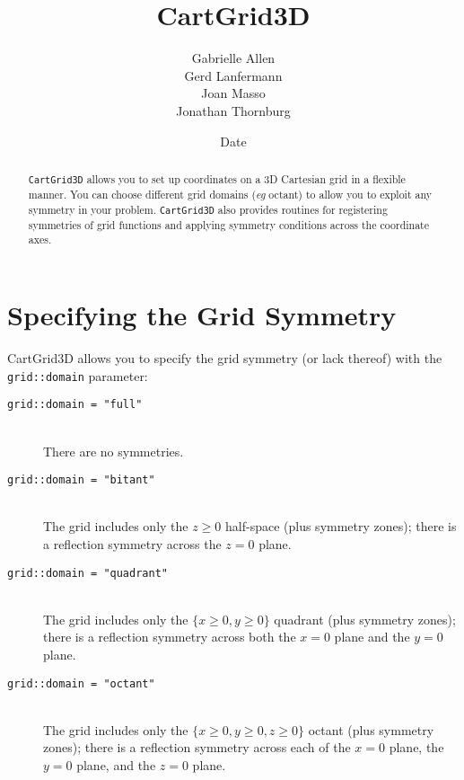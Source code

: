 \documentclass{article}
\begin{document}
\title{CartGrid3D}
\author{Gabrielle Allen \\ Gerd Lanfermann \\ Joan Masso \\ Jonathan Thornburg}
\date{$ $Date$ $}

\maketitle


\begin{abstract}
{\tt CartGrid3D} allows you to set up coordinates on a 3D Cartesian
grid in a flexible manner.  You can choose different grid domains
({\it eg} octant) to allow you to exploit any symmetry in your problem.
{\tt CartGrid3D} also provides routines for registering symmetries
of grid functions and applying symmetry conditions across the
coordinate axes. 
\end{abstract}


\section{Specifying the Grid Symmetry}

CartGrid3D allows you to specify the grid symmetry (or lack thereof) with the
\verb|grid::domain| parameter:
\begin{description}
\item[{\tt grid::domain = "full"}]\mbox{}\\
	There are no symmetries.
\item[{\tt grid::domain = "bitant"}]\mbox{}\\
	The grid includes only the $z \ge 0$ half-space
	(plus symmetry zones); there is a reflection symmetry
	across the $z=0$ plane.
\item[{\tt grid::domain = "quadrant"}]\mbox{}\\
	The grid includes only the $\{x \ge 0, y \ge 0\}$ quadrant
	(plus symmetry zones); there is a reflection symmetry
	across both the $x=0$ plane and the $y=0$ plane.
\item[{\tt grid::domain = "octant"}]\mbox{}\\
	The grid includes only the $\{x \ge 0, y \ge 0, z \ge 0\}$
	octant (plus symmetry zones); there is a reflection symmetry
	across each of the $x=0$ plane, the $y=0$ plane, and the $z=0$
	plane.
\end{description}
\end{document}
